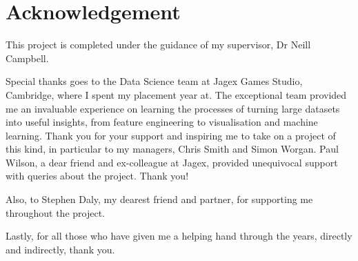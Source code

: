 \chapter*{Acknowledgement}
This project is completed under the guidance of my supervisor, Dr Neill Campbell.  

Special thanks goes to the Data Science team at Jagex Games Studio, Cambridge, where I spent my placement year at. The exceptional team provided me an invaluable experience on learning the processes of turning large datasets into useful insights, from feature engineering to visualisation and machine learning. Thank you for your support and inspiring me to take on a project of this kind, in particular to my managers, Chris Smith and Simon Worgan. Paul Wilson, a dear friend and ex-colleague at Jagex, provided unequivocal support with queries about the project. Thank you! 

Also, to Stephen Daly, my dearest friend and partner, for supporting me throughout the project.

Lastly, for all those who have given me a helping hand through the years, directly and indirectly, thank you.
